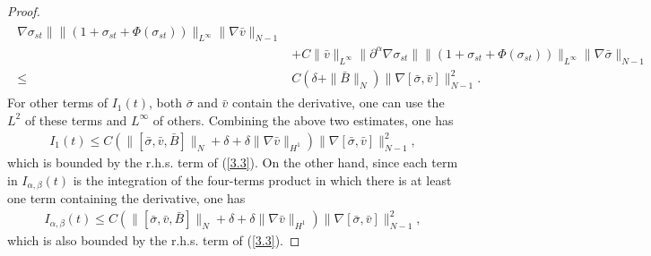 \documentclass[11pt]{amsart}
\numberwithin{equation}{section}
\begin{document}
\begin{proof}
\begin{eqnarray*}
\begin{aligned}
\nabla\sigma_{st}\|\|(1+\sigma_{st}+\Phi(\sigma_{st}))\|_{L^{\infty}}
\|\nabla\bar{v}\|_{N-1}\\
&+C \|\bar{v}\|_{L^{\infty}}\|\partial^{\alpha}
\nabla\sigma_{st}\|\|(1+\sigma_{st}+\Phi(\sigma_{st}))\|_{L^{\infty}}
\|\nabla\bar{\sigma}\|_{N-1}\\
\leq &
C(\delta+\|\bar{B}\|_{N})\|\nabla[\bar{\sigma},\bar{v}]\|_{N-1}^2.
 \end{aligned}
\end{eqnarray*}
For other terms of $I_{1}(t)$, both $\bar{\sigma}$ and $\bar{v}$
contain the derivative, one can use the $L^{2}$ of these terms and
$L^{\infty}$ of others. Combining the above two estimates, one has
\begin{eqnarray*}
I_{1}(t)\leq C (\|[\bar{\sigma},\bar{v},\bar{B}]\|_{N}
  +\delta+\delta\|\nabla \bar{v}\|_{H^1})\|\nabla
  [\bar{\sigma},\bar{v}]\|_{N-1}^{2},
\end{eqnarray*}
which is bounded by the r.h.s. term of (\ref{3.3}). On the other
hand, since each term in $I_{\alpha,\beta}(t)$ is the integration of
the four-terms product in which there is at least one term
containing the derivative, one has
\begin{eqnarray*}
I_{\alpha,\beta}(t)\leq C (\|[\bar{\sigma},\bar{v},\bar{B}]\|_{N}
  +\delta+\delta\|\nabla \bar{v}\|_{H^1})\|\nabla
  [\bar{\sigma},\bar{v}]\|_{N-1}^{2},
\end{eqnarray*}
which is also bounded by the r.h.s. term of (\ref{3.3}).


\end{proof}
\end{document}
